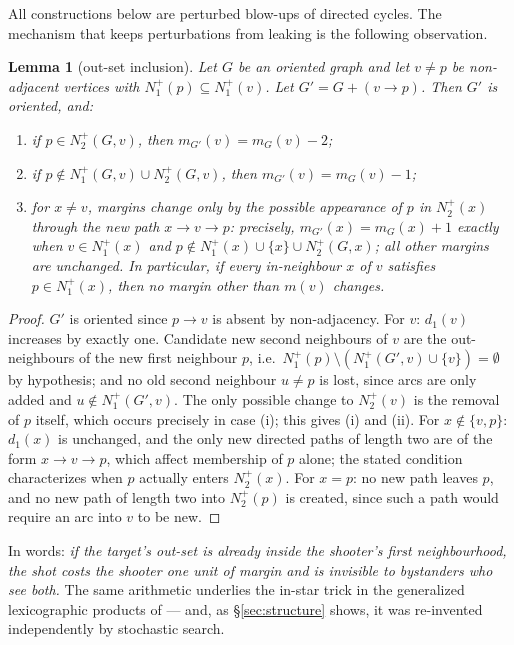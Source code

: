 \documentclass[11pt]{amsart}
\newtheorem{lemma}[theorem]{Lemma}
\theoremstyle{remark}
\begin{document}
All constructions below are perturbed blow-ups of directed cycles. The
mechanism that keeps perturbations from leaking is the following observation.

\begin{lemma}[out-set inclusion]\label{lem:outset}
Let $G$ be an oriented graph and let $v \ne p$ be non-adjacent vertices with
$N_1^+(p) \subseteq N_1^+(v)$. Let $G' = G + (v \to p)$. Then $G'$ is
oriented, and:
\begin{enumerate}
\item[(i)] if $p \in N_2^+(G, v)$, then $m_{G'}(v) = m_G(v) - 2$;
\item[(ii)] if $p \notin N_1^+(G,v) \cup N_2^+(G, v)$, then
  $m_{G'}(v) = m_G(v) - 1$;
\item[(iii)] for $x \ne v$, margins change only by the possible appearance
  of $p$ in $N_2^+(x)$ through the new path $x \to v \to p$: precisely,
  $m_{G'}(x) = m_G(x) + 1$ exactly when $v \in N_1^+(x)$ and
  $p \notin N_1^+(x) \cup \{x\} \cup N_2^+(G, x)$; all other margins are
  unchanged. In particular, if every in-neighbour $x$ of $v$ satisfies
  $p \in N_1^+(x)$, then no margin other than $m(v)$ changes.
\end{enumerate}
\end{lemma}

\begin{proof}
$G'$ is oriented since $p \to v$ is absent by non-adjacency. For $v$:
$d_1(v)$ increases by exactly one. Candidate new second neighbours of $v$
are the out-neighbours of the new first neighbour $p$, i.e.\
$N_1^+(p) \setminus (N_1^+(G',v) \cup \{v\}) = \emptyset$ by hypothesis;
and no old second neighbour $u \ne p$ is lost, since arcs are only added
and $u \notin N_1^+(G', v)$. The only possible change to $N_2^+(v)$ is the
removal of $p$ itself, which occurs precisely in case (i); this gives (i)
and (ii). For $x \notin \{v, p\}$: $d_1(x)$ is unchanged, and the only new
directed paths of length two are of the form $x \to v \to p$, which affect
membership of $p$ alone; the stated condition characterizes when $p$
actually enters $N_2^+(x)$. For $x = p$: no new path leaves $p$, and no new
path of length two into $N_2^+(p)$ is created, since such a path would
require an arc into $v$ to be new.
\end{proof}

In words: \emph{if the target's out-set is already inside the shooter's
first neighbourhood, the shot costs the shooter one unit of margin and is
invisible to bystanders who see both.} The same arithmetic underlies the
in-star trick in the generalized lexicographic products of
\cite{GuoKangZwaneveld2026} --- and, as \S\ref{sec:structure} shows, it was
re-invented independently by stochastic search.
\end{document}
